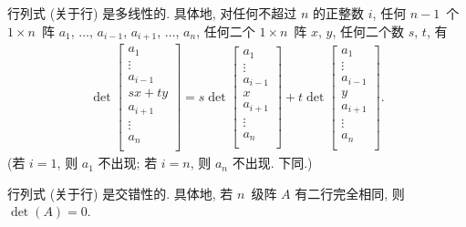 \begin{theorem}[多线性]
    行列式 (关于行) 是多线性的.
    具体地, 对任何不超过 \(n\) 的正整数 \(i\),
    任何 \(n-1\)~个 \(1 \times n\)~阵
    \(a_1\), \(\dots\), \(a_{i-1}\),
    \(a_{i+1}\), \(\dots\), \(a_n\),
    任何二个 \(1 \times n\)~阵 \(x\), \(y\),
    任何二个数 \(s\), \(t\),
    有
    \begin{align*}
        \det
        {\begin{bmatrix}
                 a_1     \\
                 \vdots  \\
                 a_{i-1} \\
                 sx + ty \\
                 a_{i+1} \\
                 \vdots  \\
                 a_{n}   \\
             \end{bmatrix}}
        =
        s
        \det
        {\begin{bmatrix}
                 a_1     \\
                 \vdots  \\
                 a_{i-1} \\
                 x       \\
                 a_{i+1} \\
                 \vdots  \\
                 a_{n}   \\
             \end{bmatrix}}
        +
        t
        \det
        {\begin{bmatrix}
                 a_1     \\
                 \vdots  \\
                 a_{i-1} \\
                 y       \\
                 a_{i+1} \\
                 \vdots  \\
                 a_{n}   \\
             \end{bmatrix}}.
    \end{align*}
    (若 \(i = 1\), 则 \(a_1\) 不出现;
    若 \(i = n\), 则 \(a_n\) 不出现.
    下同.)
\end{theorem}

\begin{theorem}[交错性]
    行列式 (关于行) 是交错性的.
    具体地,
    若 \(n\)~级阵 \(A\) 有二行完全相同,
    则 \(\det {(A)} = 0\).
\end{theorem}

